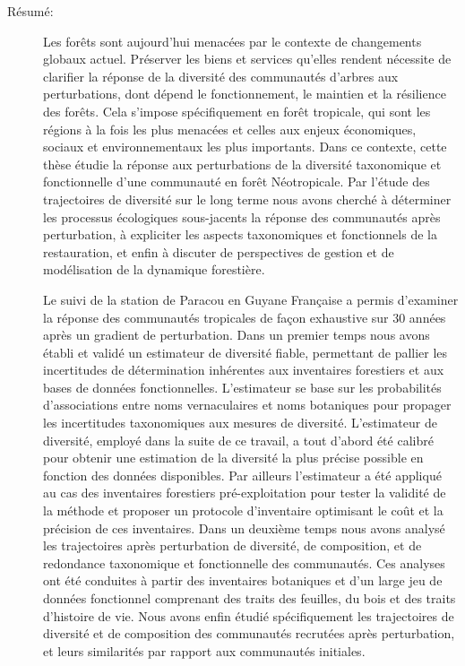 \documentclass[
  11pt,
  french,
  A4paper,
  extrafontsizes,onecolumn,openright
  ]{memoir}
\begin{document}
\begin{normalsize}

\begin{description}

\item[Résumé:]
Les forêts sont aujourd'hui menacées par le contexte de changements
globaux actuel. Préserver les biens et services qu'elles rendent
nécessite de clarifier la réponse de la diversité des communautés
d'arbres aux perturbations, dont dépend le fonctionnement, le maintien
et la résilience des forêts. Cela s'impose spécifiquement en forêt
tropicale, qui sont les régions à la fois les plus menacées et celles
aux enjeux économiques, sociaux et environnementaux les plus importants.
Dans ce contexte, cette thèse étudie la réponse aux perturbations de la
diversité taxonomique et fonctionnelle d'une communauté en forêt
Néotropicale. Par l'étude des trajectoires de diversité sur le long
terme nous avons cherché à déterminer les processus écologiques
sous-jacents la réponse des communautés après perturbation, à expliciter
les aspects taxonomiques et fonctionnels de la restauration, et enfin à
discuter de perspectives de gestion et de modélisation de la dynamique
forestière.

Le suivi de la station de Paracou en Guyane Française a permis
d'examiner la réponse des communautés tropicales de façon exhaustive sur
30 années après un gradient de perturbation. Dans un premier temps nous
avons établi et validé un estimateur de diversité fiable, permettant de
pallier les incertitudes de détermination inhérentes aux inventaires
forestiers et aux bases de données fonctionnelles. L'estimateur se base
sur les probabilités d'associations entre noms vernaculaires et noms
botaniques pour propager les incertitudes taxonomiques aux mesures de
diversité. L'estimateur de diversité, employé dans la suite de ce
travail, a tout d'abord été calibré pour obtenir une estimation de la
diversité la plus précise possible en fonction des données disponibles.
Par ailleurs l'estimateur a été appliqué au cas des inventaires
forestiers pré-exploitation pour tester la validité de la méthode et
proposer un protocole d'inventaire optimisant le coût et la précision de
ces inventaires. Dans un deuxième temps nous avons analysé les
trajectoires après perturbation de diversité, de composition, et de
redondance taxonomique et fonctionnelle des communautés. Ces analyses
ont été conduites à partir des inventaires botaniques et d'un large jeu
de données fonctionnel comprenant des traits des feuilles, du bois et
des traits d'histoire de vie. Nous avons enfin étudié spécifiquement les
trajectoires de diversité et de composition des communautés recrutées
après perturbation, et leurs similarités par rapport aux communautés
initiales.


\end{description}
\end{normalsize}
\end{document}
